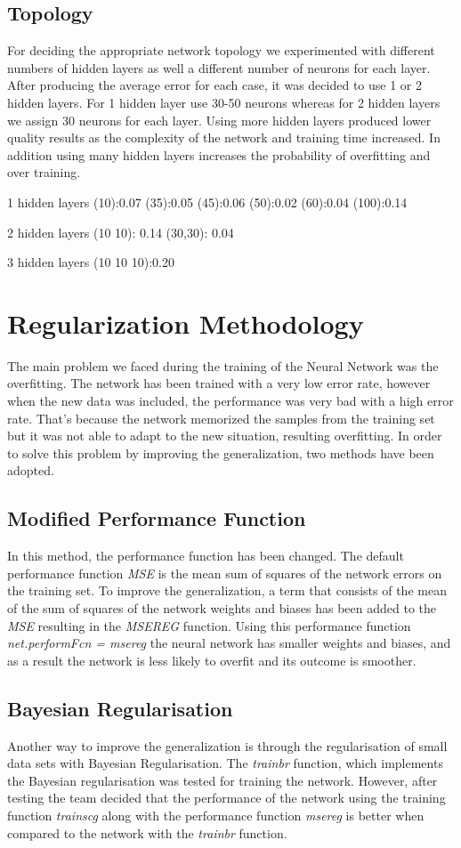 \documentclass[a4paper,11pt]{article}
\begin{document}
\subsection{Topology}
For deciding the appropriate network topology we experimented with different numbers of hidden layers as well a different number of neurons for each layer. After producing the average error for each case, it was decided to use 1 or 2 hidden layers. For 1 hidden layer use 30-50 neurons whereas for 2 hidden layers we assign 30 neurons for each layer. Using more hidden layers produced lower quality results as the complexity of the network and training time increased. In addition using many hidden layers increases the probability of overfitting and over training. 	

1 hidden layers
(10):0.07
(35):0.05
(45):0.06
(50):0.02
(60):0.04
(100):0.14

2 hidden layers 
(10 10): 0.14
(30,30): 0.04  

3 hidden layers 
(10 10 10):0.20

\section{Regularization Methodology}
The main problem we faced during the training of the Neural Network was the overfitting. The network has been trained with a very low error rate, however when the new data was included, the performance was very bad with a high error rate. That’s because the network memorized the samples from the training set but it was not able to adapt to the new situation, resulting overfitting. In order to solve this problem by improving the generalization, two methods have been adopted.

\subsection{Modified Performance Function}
In this method, the performance function has been changed. The default performance function \emph{MSE} is the mean sum of squares of the network errors on the training set. To improve the generalization, a term that consists of the mean of the sum of squares of the network weights and biases has been added to the \emph{MSE} resulting in the \emph{MSEREG} function. Using this performance function \emph{net.performFcn = msereg} the neural network has smaller weights and biases, and as a result the network is less likely to overfit and its outcome is smoother.

\subsection{Bayesian Regularisation}
Another way to improve the generalization is through the regularisation of small data sets with Bayesian Regularisation. The \emph{trainbr} function, which implements the Bayesian regularisation was tested for training the network. However, after testing the team decided that the performance of the network using the training function \emph{trainscg} along with the performance function \emph{msereg} is better when compared to the network with the \emph{trainbr} function.
\end{document}
